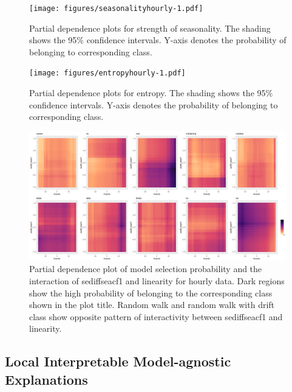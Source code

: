 \documentclass[11pt,a4paper,]{article}
\begin{document}
\begin{figure}
\centering
\texttt{[image: figures/seasonalityhourly-1.pdf]}
\caption{\label{fig:seasonalityhourly}Partial dependence plots for strength of seasonality. The shading shows the 95\% confidence intervals. Y-axis denotes the probability of belonging to corresponding class.}
\end{figure}

\begin{figure}
\centering
\texttt{[image: figures/entropyhourly-1.pdf]}
\caption{\label{fig:entropyhourly}Partial dependence plots for entropy. The shading shows the 95\% confidence intervals. Y-axis denotes the probability of belonging to corresponding class.}
\end{figure}

\begin{figure}
\centering
\includegraphics{figures/htwopdp-1.png}
\caption{\label{fig:htwopdp}Partial dependence plot of model selection probability and the interaction of sediffseacf1 and linearity for hourly data. Dark regions show the high probability of belonging to the corresponding class shown in the plot title. Random walk and random walk with drift class show opposite pattern of interactivity between sediffseacf1 and linearity.}
\end{figure}

\hypertarget{local-interpretable-model-agnostic-explanations}{%
\subsection{Local Interpretable Model-agnostic Explanations}\label{local-interpretable-model-agnostic-explanations}}
\end{document}
